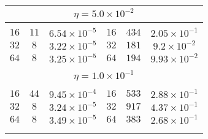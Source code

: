 \documentclass[10pt]{article}
\begin{document}
\begin{table}[]
\begin{center}
\begin{tabular}{@{}ccc|ccc@{}}
\multicolumn{6}{c}{$\eta = 5.0\times 10^{-2}$} \\[5pt]
\hline\\[-11pt]
$16$ & $11$ & $6.54\times 10^{-5}$ & $16$ & $434$ & $2.05\times 10^{-1}$ \\ [1pt]
$32$ & $8$ & $3.22\times 10^{-5}$  & $32$ & $181$ & $9.2\times 10^{-2}$  \\ [1pt]
$64$ & $8$ & $3.25\times 10^{-5}$  & $64$ & $194$ & $9.93\times 10^{-2}$ \\ [1pt]
\hline\\[-11pt]

\multicolumn{6}{c}{$\eta = 1.0\times 10^{-1}$} \\[5pt]
\hline\\[-11pt]
$16$ & $44$ & $9.45\times 10^{-4}$ & $16$ & $533$ & $2.88\times 10^{-1}$ \\ [1pt]
$32$ & $8$ & $3.24\times 10^{-5}$  & $32$ & $917$ & $4.37\times 10^{-1}$ \\ [1pt]
$64$ & $8$ & $3.49\times 10^{-5}$  & $64$ & $383$ & $2.68\times 10^{-1}$ \\ [1pt]
\hline\\[-11pt]


\hline\\[-8pt]
\end{tabular}\\[5pt]
\end{center}
\normalsize
\end{table}
\end{document}
